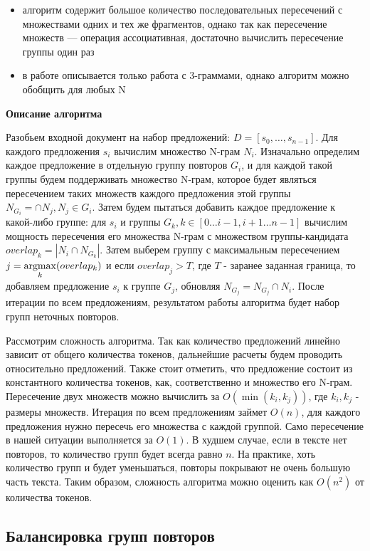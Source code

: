 \documentclass[14pt]{matmex-diploma-custom}
\begin{document}
\begin{itemize}
	\item алгоритм содержит большое количество последовательных пересечений с множествами одних и тех же фрагментов, однако так как пересечение множеств --- операция ассоциативная, достаточно вычислить пересечение группы один раз
	\item в работе описывается только работа с 3-граммами, однако алгоритм можно обобщить для любых N
\end{itemize}

\textbf{Описание алгоритма}

Разобьем входной документ на набор предложений:	$D = [s_0,\dots,s_{n-1}]$. Для каждого предложения $s_i$ вычислим множество N-грам $N_i$. Изначально определим каждое предложение в отдельную группу повторов $G_i$, и для каждой такой группы будем поддерживать множество N-грам, которое будет являться пересечением таких множеств каждого предложения этой группы $N_{G_i} = \cap N_j, N_j\in G_i$. Затем будем пытаться добавить каждое предложение к какой-либо группе: для $s_i$ и группы $G_k, k\in[0\dots i-1, i+1\dots n-1]$ вычислим мощность пересечения его множества N-грам с множеством группы-кандидата $overlap_k = |N_i \cap N_{G_k}|$. Затем выберем группу с максимальным пересечением $j = \operatorname*{argmax}\limits_{k} (overlap_k)$ и если $overlap_j > T$, где $T$ - заранее заданная граница, то добавляем предложение $s_i$ к группе $G_j$, обновляя $N_{G_j} = N_{G_j} \cap N_i$. После итерации по всем предложениям, результатом работы алгоритма будет набор групп неточных повторов.

Рассмотрим сложность алгоритма. Так как количество предложений линейно зависит от общего количества токенов, дальнейшие расчеты будем проводить относительно предложений. Также стоит отметить, что предложение состоит из константного количества токенов, как, соответственно и множество его N-грам. Пересечение двух множеств можно вычислить за $O(\min(k_i, k_j))$, где $k_i, k_j$ - размеры множеств. Итерация по всем предложениям займет $O(n)$, для каждого предложения нужно пересечь его множества с каждой группой. Само пересечение в нашей ситуации выполняется за $O(1)$. В худшем случае, если в тексте нет повторов, то количество групп будет всегда равно $n$. На практике, хоть количество групп и будет уменьшаться, повторы покрывают не очень большую часть текста. Таким образом, сложность алгоритма можно оценить как $O(n^2)$ от количества токенов.

\subsection{Балансировка групп повторов}
\end{document}
